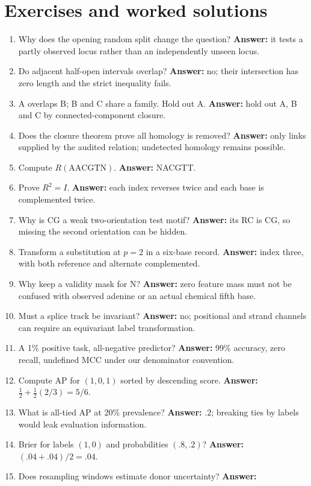 \section{Exercises and worked solutions}
\begin{enumerate}
\item Why does the opening random split change the question? \textbf{Answer:}
it tests a partly observed locus rather than an independently unseen locus.
\item Do adjacent half-open intervals overlap? \textbf{Answer:} no; their
intersection has zero length and the strict inequality fails.
\item A overlaps B; B and C share a family. Hold out A. \textbf{Answer:}
hold out A, B and C by connected-component closure.
\item Does the closure theorem prove all homology is removed? \textbf{Answer:}
only links supplied by the audited relation; undetected homology remains possible.
\item Compute $R(\mathrm{AACGTN})$. \textbf{Answer:} NACGTT.
\item Prove $R^2=I$. \textbf{Answer:} each index reverses twice and each
base is complemented twice.
\item Why is CG a weak two-orientation test motif? \textbf{Answer:} its RC
is CG, so missing the second orientation can be hidden.
\item Transform a substitution at $p=2$ in a six-base record. \textbf{Answer:}
index three, with both reference and alternate complemented.
\item Why keep a validity mask for N? \textbf{Answer:} zero feature mass must
not be confused with observed adenine or an actual chemical fifth base.
\item Must a splice track be invariant? \textbf{Answer:} no; positional and
strand channels can require an equivariant label transformation.
\item A 1\% positive task, all-negative predictor? \textbf{Answer:}
99\% accuracy, zero recall, undefined MCC under our denominator convention.
\item Compute AP for $(1,0,1)$ sorted by descending score. \textbf{Answer:}
$\tfrac12+\tfrac12(2/3)=5/6$.
\item What is all-tied AP at 20\% prevalence? \textbf{Answer:} $.2$;
breaking ties by labels would leak evaluation information.
\item Brier for labels $(1,0)$ and probabilities $(.8,.2)$? \textbf{Answer:}
$(.04+.04)/2=.04$.
\item Does resampling windows estimate donor uncertainty? \textbf{Answer:}

\end{enumerate}
